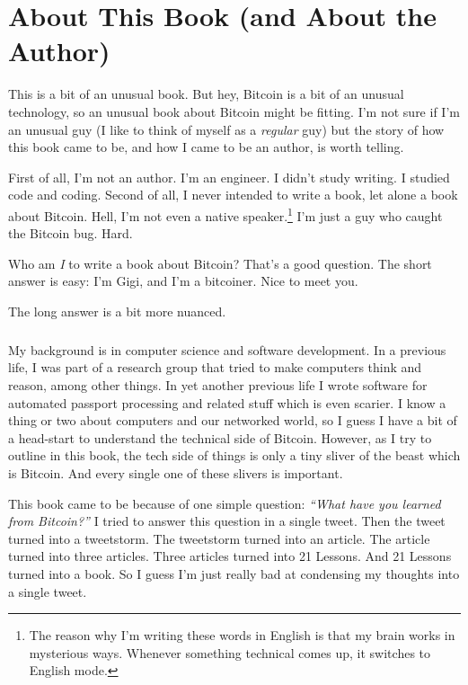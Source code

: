 
\def\bitcoinB{\leavevmode
  {\setbox0=\hbox{\textsf{B}}%
    \dimen0\ht0 \advance\dimen0 0.2ex
    \ooalign{\hfil \box0\hfil\cr
      \hfil\vrule height \dimen0 depth.2ex\hfil\cr
    }%
  }%
}

\chapter*{About This Book (and About the Author)}

This is a bit of an unusual book. But hey, Bitcoin is a bit of an unusual
technology, so an unusual book about Bitcoin might be fitting. I'm not sure if
I'm an unusual guy (I like to think of myself as a \textit{regular} guy) but the
story of how this book came to be, and how I came to be an author, is worth
telling.

First of all, I'm not an author. I'm an engineer. I didn't study writing. I
studied code and coding. Second of all, I never intended to write a book, let
alone a book about Bitcoin. Hell, I'm not even a native speaker.\footnote{The
reason why I'm writing these words in English is that my brain works in
mysterious ways. Whenever something technical comes up, it switches to English
mode.} I'm just a guy who caught the Bitcoin bug. Hard.

Who am \textit{I} to write a book about Bitcoin? That's a good question. The
short answer is easy: I'm Gigi, and I'm a bitcoiner. Nice to meet you.

The long answer is a bit more nuanced.

\paragraph{} My background is in computer science and software development. In a
previous life, I was part of a research group that tried to make computers think
and reason, among other things. In yet another previous life I wrote software
for automated passport processing and related stuff which is even scarier. I
know a thing or two about computers and our networked world, so I guess I have a
bit of a head-start to understand the technical side of Bitcoin. However, as I
try to outline in this book, the tech side of things is only a tiny sliver of
the beast which is Bitcoin. And every single one of these slivers is important.

This book came to be because of one simple question: \textit{\enquote{What have
you learned from Bitcoin?}} I tried to answer this question in a single tweet.
Then the tweet turned into a tweetstorm. The tweetstorm turned into an article.
The article turned into three articles. Three articles turned into 21 Lessons.
And 21 Lessons turned into a book. So I guess I'm just really bad at condensing
my thoughts into a single tweet.

